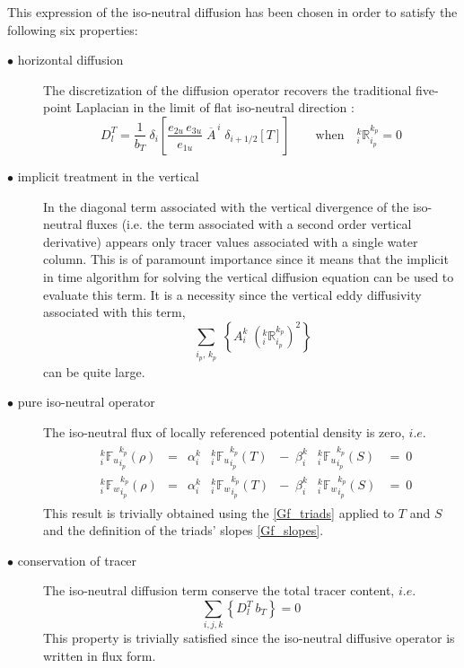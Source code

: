 \documentclass[NEMO_book]{subfiles}
\begin{document}
This expression of the iso-neutral diffusion has been chosen in order to satisfy 
the following six properties:
\begin{description}
\item[$\bullet$ horizontal diffusion] The discretization of the diffusion operator 
recovers the traditional five-point Laplacian in the limit of flat iso-neutral direction :
\begin{equation} \label{Gf_property1a}
D_l^T = \frac{1}{b_T}  \ \delta_{i} 
	\left[ \frac{e_{2u}\,e_{3u}}{e_{1u}} \; \overline{A}^{\,i} \; \delta_{i+1/2}[T] \right] 
\qquad  \text{when} \quad 
	{ _i^k \mathbb{R}_{i_p}^{k_p} }=0
\end{equation}

\item[$\bullet$ implicit treatment in the vertical]  In the diagonal term associated 
with the vertical divergence of the iso-neutral fluxes (i.e. the term associated 
with a second order vertical derivative) appears only tracer values associated 
with a single water column. This is of paramount importance since it means
that the implicit in time algorithm for solving the vertical diffusion equation can 
be used to evaluate this term. It is a necessity since the vertical eddy diffusivity 
associated with this term,  
\begin{equation}
	 \sum_{\substack{i_p, \,k_p}} \left\{  
		A_i^k \; \left(_i^k \mathbb{R}_{i_p}^{k_p}\right)^2
	\right\} 
\end{equation}
can be quite large.

\item[$\bullet$ pure iso-neutral operator]  The iso-neutral flux of locally referenced 
potential density is zero, $i.e.$
\begin{align} \label{Gf_property2}
\begin{matrix}
&{_i^k {\mathbb{F}_u}_{i_p}^{k_p} (\rho)} 
	&=    &\alpha_i^k   &{_i^k {\mathbb{F}_u}_{i_p}^{k_p} } (T) 
	&- \ \;  \beta _i^k    &{_i^k {\mathbb{F}_u}_{i_p}^{k_p} } (S) & = \ 0   \\
&{_i^k {\mathbb{F}_w}_{i_p}^{k_p} (\rho)} 
	&=    &\alpha_i^k   &{_i^k {\mathbb{F}_w}_{i_p}^{k_p} } (T) 
	&- \  \; \beta _i^k    &{_i^k {\mathbb{F}_w}_{i_p}^{k_p} } (S)  &= \ 0
\end{matrix}
\end{align}
This result is trivially obtained using the \eqref{Gf_triads} applied to $T$ and $S$ 
and the definition of the triads' slopes \eqref{Gf_slopes}.

\item[$\bullet$ conservation of tracer] The iso-neutral diffusion term conserve the 
total tracer content, $i.e.$
\begin{equation} \label{Gf_property1}
\sum_{i,j,k} \left\{ D_l^T \ b_T \right\} = 0
\end{equation}
This property is trivially satisfied since the iso-neutral diffusive operator 
is written in flux form.


\end{description}
\end{document}
